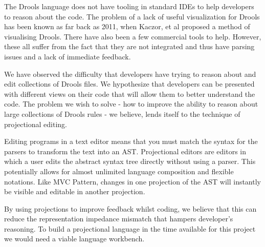 The Drools language does not have tooling in standard IDEs to help developers to reason about the code.
The problem of a lack of useful visualization for Drools has been known as far back as 2011, when Kaczor, et al\cite{kaczor2011visual} proposed a method of visualising Drools. 
There have also been a few commercial tools to help.
However, these all suffer from the fact that they are not integrated and thus have parsing issues and a lack of immediate feedback. 

We have observed the difficulty that developers have trying to reason about and edit collections of Drools files.
We hypothesize that developers can be presented with different views on their code that will allow them to better understand the code.
The problem we wish to solve - how to improve the ability to reason about large collections of Drools rules - we believe, lends itself to the technique of projectional editing.

Editing programs in a text editor means that you must match the syntax for the parsers to transform the text into an AST.
Projectional editors are editors in which a user edits the abstract syntax tree directly without using a parser\cite{voelter2014generic}.
This potentially allows for almost unlimited language composition and flexible notations.
Like MVC Pattern, changes in one projection of the AST will instantly be visible and editable in another projection\cite{guttormsen2017consistent}.

By using projections to improve feedback whilst coding, we believe that this can reduce the representation impedance mismatch that hampers developer's reasoning.
To build a projectional language in the time available for this project we would need a viable language workbench.

